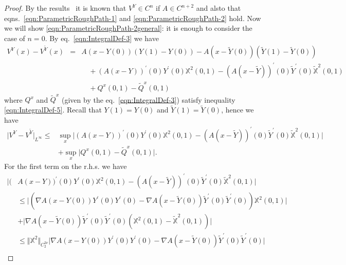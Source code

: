 \documentclass[11pt,a4paper,reqno]{amsart}%
\theoremstyle{plain}
\theoremstyle{remark}
\theoremstyle{plain}
\numberwithin{equation}{section}
\def\supl{\sup\limits}
\def\supl{\mathop{\sup}\limits}
\begin{document}
\begin{proof}%
By the results~\cite[Lemma $7$]{[Bess+Gub_2005]} it is known that $V^Y \in C^{n}$ if $A\in C^{n+2}$ and alsto that eqns.~\eqref{eqn:ParametricRoughPath-1} and
\eqref{eqn:ParametricRoughPath-2} hold. Now we will show
\eqref{eqn:ParametricRoughPath-2general}: it is enough to consider
the case of $n=0$. By eq.~\eqref{eqn:IntegralDef-3}  we have
\begin{eqnarray}
V^Y(x)-V^{\tilde{Y}}(x)&=&A(x-Y(0))(Y(1)-Y(0))
-A(x-\tilde{Y}(0))(\tilde{Y}(1)-\tilde{Y}(0))\nonumber\\
&&\quad + (A(x-Y))^\prime(0)Y^\prime(0)\mathbb{X}^2(0,1)
-(A(x-\tilde{Y}))^\prime(0)\tilde{Y}^\prime(0)\mathbb{\tilde{X}}^2(0,1)
\nonumber\\
&&\quad + Q^x(0,1)-\tilde{Q}^x(0,1)\nonumber
\end{eqnarray}
where $Q^x$ and $\tilde{Q}^x$ (given by the eq.~\eqref{eqn:IntegralDef-3}) satisfy
inequality \eqref{eqn:IntegralDef-5}. Recall that $Y(1)=Y(0)$ and $\tilde{Y}(1)=\tilde{Y}(0)$, hence we have
\begin{equation}\label{eqn:PRaux-1}
\begin{split}
\vert V^Y-V^{\tilde{Y}}\vert_{L^{\infty}}\leq &
\supl_x\vert (A(x-Y))^\prime(0)Y^\prime(0)\mathbb{X}^2(0,1)-
(A(x-\tilde{Y}))^\prime(0)\tilde{Y}^\prime(0)\mathbb{\tilde{X}}^2(0,1)\vert \\
& +\supl_x\vert Q^x(0,1)-\tilde{Q}^x(0,1)\vert .
\end{split}
\end{equation}
For the first term on the r.h.s. we have
\begin{equation}
\label{eqn:PRaux-2}
\begin{split}
\vert (&A(x-Y))^\prime(0)Y^\prime(0)\mathbb{X}^2(0,1)-
(A(x-\tilde{Y}))^\prime(0)\tilde{Y}^\prime(0)\mathbb{\tilde{X}}^2(0,1)\vert \\
&\leq
\vert (\nabla A(x-Y(0))Y^\prime(0)Y^\prime(0)-\nabla A(x-\tilde{Y}(0))\tilde{Y}^\prime(0)\tilde{Y}^\prime(0))\mathbb{X}^2(0,1)\vert \\
&+\vert \nabla A(x-\tilde{Y}(0))\tilde{Y}^\prime(0)\tilde{Y}^\prime(0)(\mathbb{X}^2(0,1)-\mathbb{\tilde{X}}^2(0,1))\vert \\
&\leq \Vert \mathbb{X}^2\Vert_{C_2^{2\nu}}\vert \nabla A(x-Y(0))Y^\prime(0)Y^\prime(0)-\nabla A(x-\tilde{Y}(0))\tilde{Y}^\prime(0)\tilde{Y}^\prime(0)\vert \\

\end{split}
\end{equation}
\end{proof}
\end{document}
